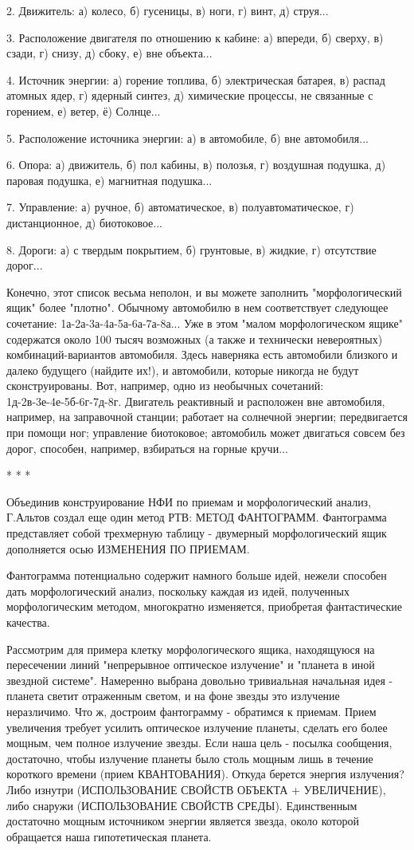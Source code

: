 \documentclass[11pt,a4paper]{article}
\begin{document}
2. Движитель: а) колесо, б) гусеницы, в) ноги, г) винт, д) струя...

3. Расположение двигателя по отношению к кабине: а) впереди, б) сверху, в) сзади, г) снизу, д) сбоку, е) вне объекта...

4. Источник энергии: а) горение топлива, б) электрическая батарея, в) распад атомных ядер, г) ядерный синтез, д) химические процессы, не связанные с горением, е) ветер, ё) Солнце...

5. Расположение источника энергии: а) в автомобиле, б) вне автомобиля...

6. Опора: а) движитель, б) пол кабины, в) полозья, г) воздушная подушка, д) паровая подушка, е) магнитная подушка...

7. Управление: а) ручное, б) автоматическое, в) полуавтоматическое, г) дистанционное, д) биотоковое...

8. Дороги: а) с твердым покрытием, б) грунтовые, в) жидкие, г) отсутствие дорог...

Конечно, этот список весьма неполон, и вы можете заполнить "морфологический ящик" более "плотно". Обычному автомобилю в нем соответствует следующее сочетание: 1а-2а-3а-4а-5а-6а-7а-8а... Уже в этом "малом морфологическом ящике" содержатся около 100 тысяч возможных (а также и технически невероятных) комбинаций-вариантов автомобиля. Здесь наверняка есть автомобили близкого и далеко будущего (найдите их!), и автомобили, которые никогда не будут сконструированы. Вот, например, одно из необычных сочетаний: 1д-2в-3е-4е-5б-6г-7д-8г. Двигатель реактивный и расположен вне автомобиля, например, на заправочной станции; работает на солнечной энергии; передвигается при помощи ног; управление биотоковое; автомобиль может двигаться совсем без дорог, способен, например, взбираться на горные кручи...

* * *

Объединив конструирование НФИ по приемам и морфологический анализ, Г.Альтов создал еще один метод РТВ: МЕТОД ФАНТОГРАММ. Фантограмма представляет собой трехмерную таблицу - двумерный морфологический ящик дополняется осью ИЗМЕНЕНИЯ ПО ПРИЕМАМ.

Фантограмма потенциально содержит намного больше идей, нежели способен дать морфологический анализ, поскольку каждая из идей, полученных морфологическим методом, многократно изменяется, приобретая фантастические качества.

Рассмотрим для примера клетку морфологического ящика, находящуюся на пересечении линий "непрерывное оптическое излучение" и "планета в иной звездной системе". Намеренно выбрана довольно тривиальная начальная идея - планета светит отраженным светом, и на фоне звезды это излучение неразличимо. Что ж, достроим фантограмму - обратимся к приемам. Прием увеличения требует усилить оптическое излучение планеты, сделать его более мощным, чем полное излучение звезды. Если наша цель - посылка сообщения, достаточно, чтобы излучение планеты было столь мощным лишь в течение короткого времени (прием КВАНТОВАНИЯ). Откуда берется энергия излучения? Либо изнутри (ИСПОЛЬЗОВАНИЕ СВОЙСТВ ОБЪЕКТА + УВЕЛИЧЕНИЕ), либо снаружи (ИСПОЛЬЗОВАНИЕ СВОЙСТВ СРЕДЫ). Единственным достаточно мощным источником энергии является звезда, около которой обращается наша гипотетическая планета.
\end{document}

